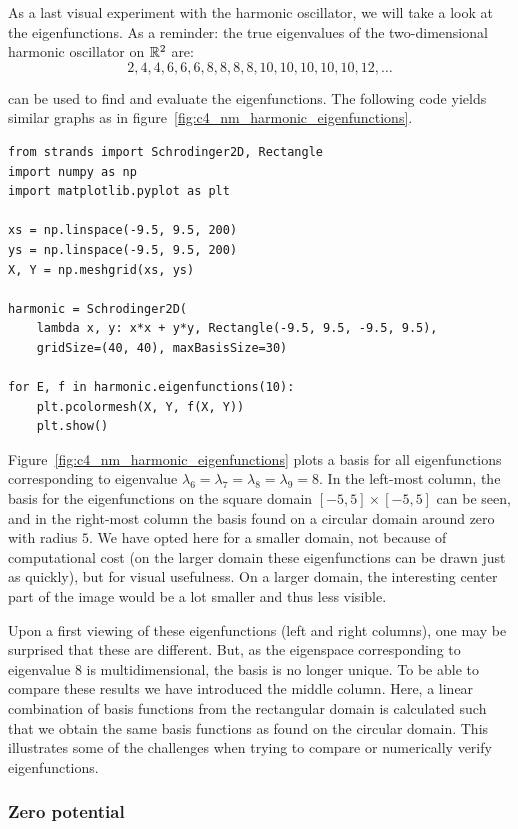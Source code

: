 As a last visual experiment with the harmonic oscillator, we will take a look at the eigenfunctions. As a reminder: the true eigenvalues of the two-dimensional harmonic oscillator on $\mathbb{R}^2$ are:
$$
    2, 4, 4, 6, 6, 6, 8, 8, 8, 8, 10, 10, 10, 10, 10, 12, \dots
$$

\strands{} can be used to find and evaluate the eigenfunctions. The following code yields similar graphs as in figure~\ref{fig:c4_nm_harmonic_eigenfunctions}.
\begin{verbatim}
from strands import Schrodinger2D, Rectangle
import numpy as np
import matplotlib.pyplot as plt

xs = np.linspace(-9.5, 9.5, 200)
ys = np.linspace(-9.5, 9.5, 200)
X, Y = np.meshgrid(xs, ys)

harmonic = Schrodinger2D(
    lambda x, y: x*x + y*y, Rectangle(-9.5, 9.5, -9.5, 9.5),
    gridSize=(40, 40), maxBasisSize=30)

for E, f in harmonic.eigenfunctions(10):
    plt.pcolormesh(X, Y, f(X, Y))
    plt.show()
\end{verbatim}

Figure~\ref{fig:c4_nm_harmonic_eigenfunctions} plots a basis for all eigenfunctions corresponding to eigenvalue $\lambda_6 = \lambda_7 = \lambda_8 = \lambda_9 = 8$. In the left-most column, the basis for the eigenfunctions on the square domain $[-5, 5] \times [-5, 5]$ can be seen, and in the right-most column the basis found on a circular domain around zero with radius $5$. We have opted here for a smaller domain, not because of computational cost (on the larger domain these eigenfunctions can be drawn just as quickly), but for visual usefulness. On a larger domain, the interesting center part of the image would be a lot smaller and thus less visible.

Upon a first viewing of these eigenfunctions (left and right columns), one may be surprised that these are different. But, as the eigenspace corresponding to eigenvalue $8$ is multidimensional, the basis is no longer unique. To be able to compare these results we have introduced the middle column. Here, a linear combination of basis functions from the rectangular domain is calculated such that we obtain the same basis functions as found on the circular domain. This illustrates some of the challenges when trying to compare or numerically verify eigenfunctions.

\subsubsection{Zero potential}\label{sec:c4_numerical_zero}

